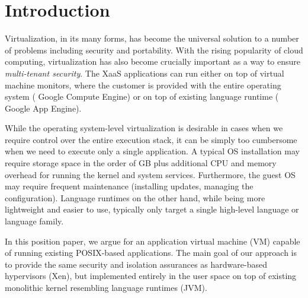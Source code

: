\section{Introduction}
\label{sec:intro}



Virtualization, in its many forms, has become the universal solution to
a number of problems including security and portability.  With the
rising popularity of cloud computing, virtualization has also become
crucially important as a way to ensure \emph{multi-tenant security}. The
XaaS applications can run either on top of virtual machine monitors,
where the customer is provided with the entire operating system (\eg
Google Compute Engine) or on top of existing language runtime (\eg
Google App Engine).

While the operating system-level virtualization is desirable in cases
when we require control over the entire execution stack, it can be
simply too cumbersome when we need to execute only a single application.
A typical OS installation may require storage space in the order of GB
plus additional CPU and memory overhead for running the kernel and
system services. Furthermore, the guest OS may require frequent
maintenance (\eg installing updates, managing the configuration).
Language runtimes on the other hand, while being more lightweight and
easier to use, typically only target a single high-level language or
language family. 

In this position paper, we argue for an application virtual machine (VM)
capable of running existing POSIX-based applications. The main goal of
our approach is to provide the same security and isolation assurances as
hardware-based hypervisors (\eg Xen), but implemented entirely in the
user space on top of existing monolithic kernel resembling language
runtimes (\eg JVM).



